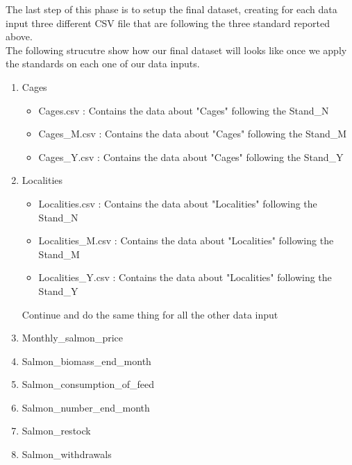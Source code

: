 The last step of this phase is to setup the final dataset, creating for each data input three different CSV file that are following the three standard reported above.\\
The following strucutre show how our final dataset will looks like once we apply the standards on each one of our data inputs.
\begin{enumerate}
\item Cages
	\begin{itemize}
		\item Cages.csv : Contains the data about "Cages" following the Stand\_N
		\item Cages\_M.csv : Contains the data about "Cages" following the Stand\_M
		\item Cages\_Y.csv : Contains the data about "Cages" following the Stand\_Y
	\end{itemize}
\item Localities
	\begin{itemize}
		\item Localities.csv : Contains the data about "Localities" following the Stand\_N
		\item Localities\_M.csv : Contains the data about "Localities" following the Stand\_M
		\item Localities\_Y.csv : Contains the data about "Localities" following the Stand\_Y
	\end{itemize}
Continue and do the same thing for all the other data input
\item Monthly\_salmon\_price 
\item Salmon\_biomass\_end\_month
\item Salmon\_consumption\_of\_feed
\item Salmon\_number\_end\_month
\item Salmon\_restock
\item Salmon\_withdrawals
\end{enumerate}

\newpage







